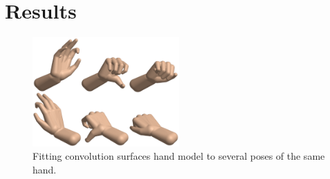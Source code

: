 \section{Results}

\begin{figure}[h!] 
	\centering
	\includegraphics[width=0.5\textwidth]{fig/modeling}
	\caption{Fitting convolution surfaces hand model to several poses of the same hand.}
	\label{fig:modeling}
\end{figure}



